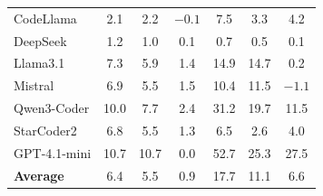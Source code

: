 \documentclass[lettersize,journal]{IEEEtran}
\providecommand{\DIFaddendFL}{} %
\DeclareRobustCommand{\DIFaddendFL}{\DIFOaddendFL \let\includegraphics\DIFOincludegraphics} %
\begin{document}
\begin{table}[!t]
{\begin{tabular}{lcccccc}
    \midrule
    CodeLlama & 2.1 & 2.2 & $-0.1$ & 7.5 & 3.3 & 4.2 \\
    DeepSeek & 1.2 & 1.0 & 0.1 & 0.7 & 0.5 & 0.1 \\
    Llama3.1 & 7.3 & 5.9 & 1.4 & 14.9 & 14.7 & 0.2 \\
    Mistral & 6.9 & 5.5 & 1.5 & 10.4 & 11.5 & $-1.1$ \\
    Qwen3-Coder & 10.0 & 7.7 & 2.4 & 31.2 & 19.7 & 11.5 \\
    StarCoder2 & 6.8 & 5.5 & 1.3 & 6.5 & 2.6 & 4.0 \\
    GPT-4.1-mini & 10.7 & 10.7 & 0.0 & 52.7 & 25.3 & 27.5 \\
    \midrule
    \textbf{Average} & 6.4 & 5.5 & 0.9 & 17.7 & 11.1 & 6.6 \\
    \bottomrule
    \end{tabular}
    }
\DIFaddendFL \end{table}
\end{document}
